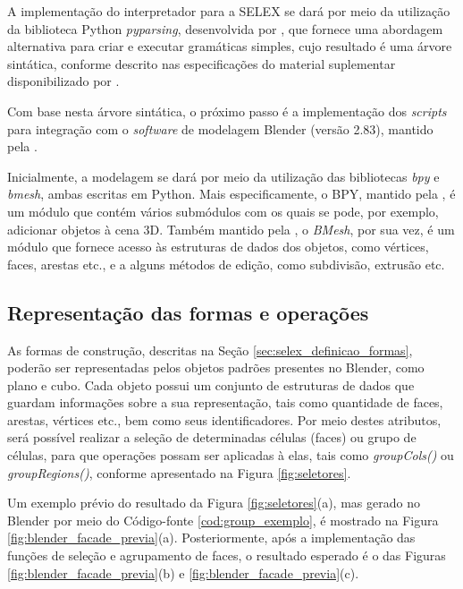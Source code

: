 A implementação do interpretador para a \gls{SELEX} se dará por meio da utilização da biblioteca Python \textit{pyparsing}, desenvolvida por , que fornece uma abordagem alternativa para criar e executar gramáticas simples, cujo resultado é uma árvore sintática, conforme descrito nas especificações do material suplementar disponibilizado por .

Com base nesta árvore sintática, o próximo passo é a implementação dos \textit{scripts} para integração com o \textit{software} de modelagem Blender (versão 2.83), mantido pela . 

Inicialmente, a modelagem se dará por meio da utilização das bibliotecas \textit{bpy} e \textit{bmesh}, ambas escritas em Python. Mais especificamente, o \gls{BPY}, mantido pela , é um módulo que contém vários submódulos com os quais se pode, por exemplo, adicionar objetos à cena 3D. Também mantido pela , o \textit{BMesh}, por sua vez, é um módulo que fornece acesso às estruturas de dados dos objetos, como vértices, faces, arestas etc., e a alguns métodos de edição, como subdivisão, extrusão etc.

\subsection{Representação das formas e operações}
\label{sec:representacao_operacao}

As formas de construção, descritas na Seção \ref{sec:selex_definicao_formas}, poderão ser representadas pelos objetos padrões presentes no Blender, como plano e cubo. Cada objeto possui um conjunto de estruturas de dados que guardam informações sobre a sua representação, tais como quantidade de faces, arestas, vértices etc., bem como seus identificadores. Por meio destes atributos, será possível realizar a seleção de determinadas células (faces) ou grupo de células, para que operações possam ser aplicadas à elas, tais como \textit{groupCols()} ou \textit{groupRegions()}, conforme apresentado na Figura \ref{fig:seletores}. 

Um exemplo prévio do resultado da Figura \ref{fig:seletores}(a), mas gerado no Blender por meio do Código-fonte \ref{cod:group_exemplo}, é mostrado na Figura \ref{fig:blender_facade_previa}(a). Posteriormente, após a implementação das funções de seleção e agrupamento de faces, o resultado esperado é o das Figuras \ref{fig:blender_facade_previa}(b) e \ref{fig:blender_facade_previa}(c).

